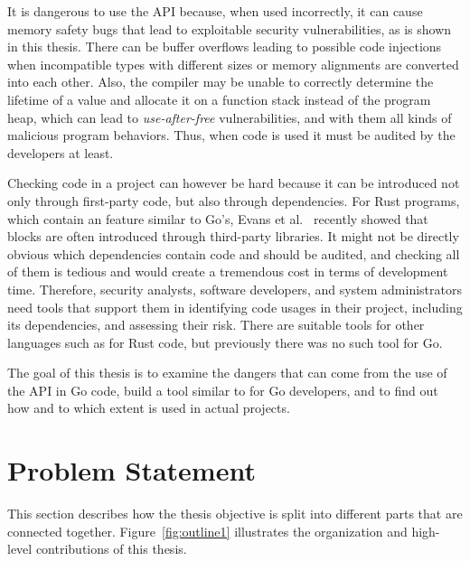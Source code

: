 It is dangerous to use the \unsafe{} \acrshort{API} because, when used incorrectly, it can cause memory safety bugs that
lead to exploitable security vulnerabilities, as is shown in this thesis.
There can be buffer overflows leading to possible code injections when incompatible types with different sizes or
memory alignments are converted into each other.
Also, the compiler may be unable to correctly determine the lifetime of a value and allocate it on a function stack
instead of the program heap, which can lead to \textit{use-after-free} vulnerabilities, and with them all kinds of
malicious program behaviors.
Thus, when \unsafe{} code is used it must be audited by the developers at least.

Checking \unsafe{} code in a project can however be hard because it can be introduced not only through first-party
code, but also through dependencies.
For Rust programs, which contain an \unsafe{} feature similar to Go's, Evans et al.~\cite{evans2020} recently showed
that \unsafe{} blocks are often introduced through third-party libraries.
It might not be directly obvious which dependencies contain \unsafe{} code and should be audited, and checking all of
them is tedious and would create a tremendous cost in terms of development time.
Therefore, security analysts, software developers, and system administrators need tools that support them in identifying
\unsafe{} code usages in their project, including its dependencies, and assessing their risk.
There are suitable tools for other languages such as \toolCargoGeiger{} for Rust code, but previously there was no such
tool for Go.

The goal of this thesis is to examine the dangers that can come from the use of the \unsafe{} \acrshort{API} in Go code,
build a tool similar to \toolCargoGeiger{} for Go developers, and to find out how and to which extent \unsafe{} is used
in actual projects.



\section{Problem Statement}\label{sec:introduction:problem-statement}

This section describes how the thesis objective is split into different parts that are connected together.
Figure~\ref{fig:outline1} illustrates the organization and high-level contributions of this thesis.


